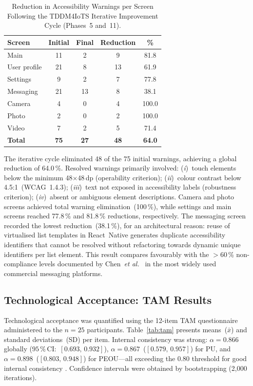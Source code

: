 \documentclass[journal]{IEEEtran}
\begin{document}
	\begin{table}[!t]
		\caption{Reduction in Accessibility Warnings per Screen Following
			the TDDM4IoTS Iterative Improvement Cycle (Phases~5 and~11).}
		\label{tab:accesibilidad}
		\centering
		\small
		\renewcommand{\arraystretch}{1.25}
		\begin{tabular}{lcccc}
			\toprule
			\textbf{Screen} & \textbf{Initial} & \textbf{Final} & \textbf{Reduction} & \textbf{\%} \\
			\midrule
			Main           & 11 & 2  & 9  & 81.8 \\
			User profile   & 21 & 8  & 13 & 61.9 \\
			Settings       & 9  & 2  & 7  & 77.8 \\
			Messaging      & 21 & 13 & 8  & 38.1 \\
			Camera         & 4  & 0  & 4  & 100.0 \\
			Photo          & 2  & 0  & 2  & 100.0 \\
			Video          & 7  & 2  & 5  & 71.4 \\
			\midrule
			\textbf{Total} & \textbf{75} & \textbf{27} & \textbf{48} & \textbf{64.0} \\
			\bottomrule
		\end{tabular}
	\end{table}
	
	The iterative cycle eliminated 48 of the 75 initial warnings,
	achieving a global reduction of 64.0\,\%.
	Resolved warnings primarily involved:
	(\textit{i})~touch elements below the minimum 48$\times$48\,dp
	(operability criterion);
	(\textit{ii})~colour contrast below 4.5:1~(WCAG~1.4.3);
	(\textit{iii})~text not exposed in accessibility labels
	(robustness criterion);
	(\textit{iv})~absent or ambiguous element descriptions.
	Camera and photo screens achieved total warning elimination~(100\,\%),
	while settings and main screens reached 77.8\,\% and 81.8\,\%
	reductions, respectively.
	The messaging screen recorded the lowest reduction~(38.1\,\%),
	for an architectural reason: reuse of virtualised list templates
	in React~Native generates duplicate accessibility identifiers
	that cannot be resolved without refactoring towards dynamic
	unique identifiers per list element.
	This result compares favourably with the $>$60\,\%
	non-compliance levels documented by Chen~\textit{et al.}~\cite{chen2022}
	in the most widely used commercial messaging platforms.
	
	\subsection{Technological Acceptance: TAM Results}
	Technological acceptance was quantified using the 12-item TAM
	questionnaire administered to the $n{=}25$ participants.
	Table~\ref{tab:tam} presents means~($\bar{x}$) and standard
	deviations~(SD) per item.
	Internal consistency was strong: $\alpha{=}0.866$ globally
	($95\,\%$\,CI:~$[0.693,\,0.932]$),
	$\alpha{=}0.867$~($[0.579,\,0.957]$) for PU, and
	$\alpha{=}0.898$~($[0.803,\,0.948]$) for PEOU---all exceeding
	the 0.80 threshold for good internal consistency
	\cite{nunnally1978}.
	Confidence intervals were obtained by bootstrapping
	(2{,}000 iterations).
	
\end{document}

